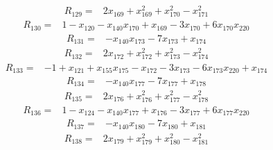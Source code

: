 \begin{equation*}\begin{split}
R_{129}={}&2x_{169} + x_{169}^{2} + x_{170}^{2} - x_{171}^{2}
\end{split}\end{equation*}
\begin{equation*}\begin{split}
R_{130}={}&1 - x_{120} - x_{140} x_{170} + x_{169} - 3x_{170} + 6x_{170} x_{220}
\end{split}\end{equation*}
\begin{equation*}\begin{split}
R_{131}={}&-x_{140} x_{173} - 7x_{173} + x_{174}
\end{split}\end{equation*}
\begin{equation*}\begin{split}
R_{132}={}&2x_{172} + x_{172}^{2} + x_{173}^{2} - x_{174}^{2}
\end{split}\end{equation*}
\begin{equation*}\begin{split}
R_{133}={}&-1 + x_{121} + x_{155} x_{175} - x_{172} - 3x_{173} - 6x_{173} x_{220} + x_{174}
\end{split}\end{equation*}
\begin{equation*}\begin{split}
R_{134}={}&-x_{140} x_{177} - 7x_{177} + x_{178}
\end{split}\end{equation*}
\begin{equation*}\begin{split}
R_{135}={}&2x_{176} + x_{176}^{2} + x_{177}^{2} - x_{178}^{2}
\end{split}\end{equation*}
\begin{equation*}\begin{split}
R_{136}={}&1 - x_{124} - x_{140} x_{177} + x_{176} - 3x_{177} + 6x_{177} x_{220}
\end{split}\end{equation*}
\begin{equation*}\begin{split}
R_{137}={}&-x_{140} x_{180} - 7x_{180} + x_{181}
\end{split}\end{equation*}
\begin{equation*}\begin{split}
R_{138}={}&2x_{179} + x_{179}^{2} + x_{180}^{2} - x_{181}^{2}
\end{split}\end{equation*}
